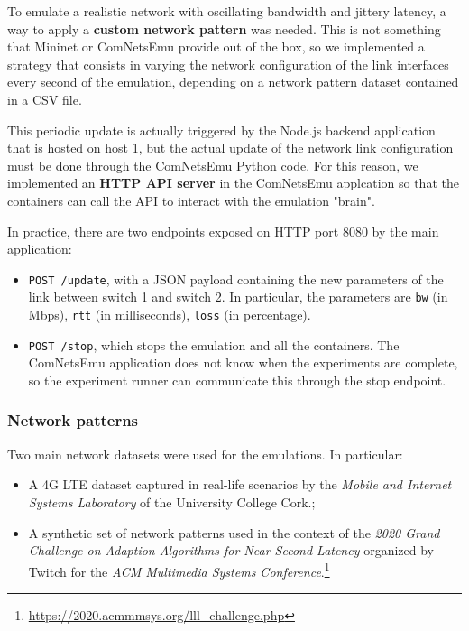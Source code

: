 To emulate a realistic network with oscillating bandwidth and jittery latency, a way to apply a \textbf{custom network pattern} was needed. This is not something that Mininet or ComNetsEmu provide out of the box, so we implemented a strategy that consists in varying the network configuration of the link interfaces every second of the emulation, depending on a network pattern dataset contained in a CSV file.

This periodic update is actually triggered by the Node.js backend application that is hosted on host 1, but the actual update of the network link configuration must be done through the ComNetsEmu Python code. For this reason, we implemented an \textbf{HTTP API server} in the ComNetsEmu applcation so that the containers can call the API to interact with the emulation "brain".

In practice, there are two endpoints exposed on HTTP port 8080 by the main application:

\begin{itemize}
    \item \texttt{POST /update}, with a JSON payload containing the new parameters of the link between switch 1 and switch 2. In particular, the parameters are \texttt{bw} (in Mbps), \texttt{rtt} (in milliseconds), \texttt{loss} (in percentage).
    \item \texttt{POST /stop}, which stops the emulation and all the containers. The ComNetsEmu application does not know when the experiments are complete, so the experiment runner can communicate this through the stop endpoint.
\end{itemize}

\subsubsection{Network patterns}
\label{sec:eval/testbed/network/patterns}

Two main network datasets were used for the emulations. In particular:

\begin{itemize}
    \item A 4G LTE dataset captured in real-life scenarios by the \textit{Mobile and Internet Systems Laboratory} of the University College Cork.\cite{dataset1};
    \item A synthetic set of network patterns used in the context of the \textit{2020 Grand Challenge on Adaption Algorithms for Near-Second Latency} organized by Twitch for the \textit{ACM Multimedia Systems Conference}.\footnote{\url{https://2020.acmmmsys.org/lll_challenge.php}}
\end{itemize}

